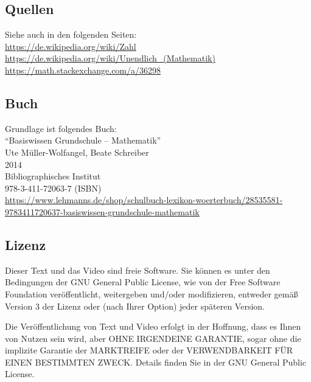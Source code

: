 \documentclass[a4paper]{amsart}
\theoremstyle{definition}
\begin{document}
\subsection*{Quellen}
Siehe auch in den folgenden Seiten:\\
\url{https://de.wikipedia.org/wiki/Zahl}\\
\url{https://de.wikipedia.org/wiki/Unendlich_(Mathematik)}\\
\url{https://math.stackexchange.com/a/36298}

\subsection*{Buch}
Grundlage ist folgendes Buch:\\
"`Basiswissen Grundschule – Mathematik"'\\
Ute Müller-Wolfangel, Beate Schreiber\\
2014\\
Bibliographisches Institut\\
978-3-411-72063-7 (ISBN)
\\
{\tiny\url{https://www.lehmanns.de/shop/schulbuch-lexikon-woerterbuch/28535581-9783411720637-basiswissen-grundschule-mathematik}}

\subsection*{Lizenz}
Dieser Text und das Video sind freie Software. Sie können es unter den Bedingungen der
GNU General Public License, wie von der Free Software Foundation veröffentlicht, weitergeben
und/oder modifizieren, entweder gemäß Version 3 der Lizenz oder (nach Ihrer Option) jeder späteren Version.

Die Veröffentlichung von Text und Video erfolgt in der Hoffnung, dass es Ihnen von Nutzen sein wird,
aber OHNE IRGENDEINE GARANTIE, sogar ohne die implizite Garantie der MARKTREIFE oder der
VERWENDBARKEIT FÜR EINEN BESTIMMTEN ZWECK. Details finden Sie in der GNU General Public License.
\end{document}
